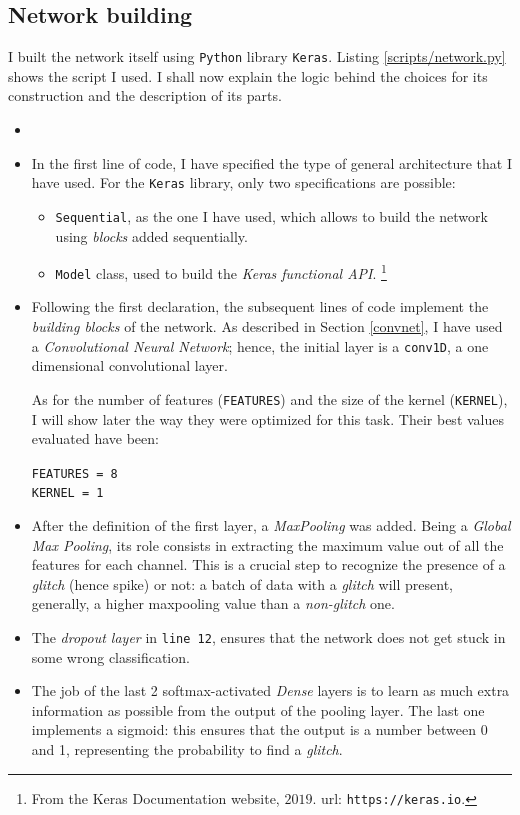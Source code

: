 \documentclass[12pt,a4paper,final]{book}			%
\newcommand{\insertcode}[2]{\begin{itemize}\item[]\end{itemize}} %
\begin{document}
			\subsection{Network building}\label{network_building}
			I built the network itself using \texttt{Python} library \texttt{Keras}. Listing \ref{scripts/network.py} shows the script I used. I shall now explain the logic behind the choices for its construction and the description of its parts.
			\insertcode{scripts/network.py}{Structure of the network as written in \texttt{Python}.}
			\begin{itemize}
				\item In the first line of code, I have specified the type of general architecture that I have used. For the \texttt{Keras} library, only two specifications are possible: 
				\begin{itemize}
					\item \texttt{Sequential}, as the one I have used, which allows to build the network using \textit{blocks} added sequentially.
					\item \texttt{Model} class, used to build the \textit{Keras functional API}.  \footnote{From the Keras Documentation website, $2019$. url: \texttt{https://keras.io}.}
				\end{itemize}
				\item Following the first declaration, the subsequent lines of code implement the \textit{building blocks} of the network. As described in Section \ref{convnet}, I have used a \textit{Convolutional Neural Network}; hence, the initial layer is a \texttt{conv1D}, a one dimensional convolutional layer. 
				
				As for the number of features (\texttt{FEATURES}) and the size of the kernel (\texttt{KERNEL}), I will show later the way they were optimized for this task.
				Their best values evaluated have been:
				\begin{center}
					\texttt{FEATURES = 8}\\
					\texttt{KERNEL = 1}
				\end{center}
				\item After the definition of the first layer, a \textit{MaxPooling} was added. Being a \textit{Global Max Pooling}, its role consists in extracting the maximum value out of all the features for each channel. This is a crucial step to recognize the presence of a \textit{glitch} (hence spike) or not: a batch of data with a \textit{glitch} will present, generally, a higher maxpooling value than a \textit{non-glitch} one. 
				\item The \textit{dropout layer} in \texttt{line 12}, ensures that the network does not get stuck in some wrong classification.
				\item The job of the last 2 softmax-activated \textit{Dense} layers is to learn as much extra information as possible from the output of the pooling layer. The last one implements a sigmoid: this ensures that the output is a number between 0 and 1, representing the probability to find a \textit{glitch}.
			\end{itemize}
\end{document}
